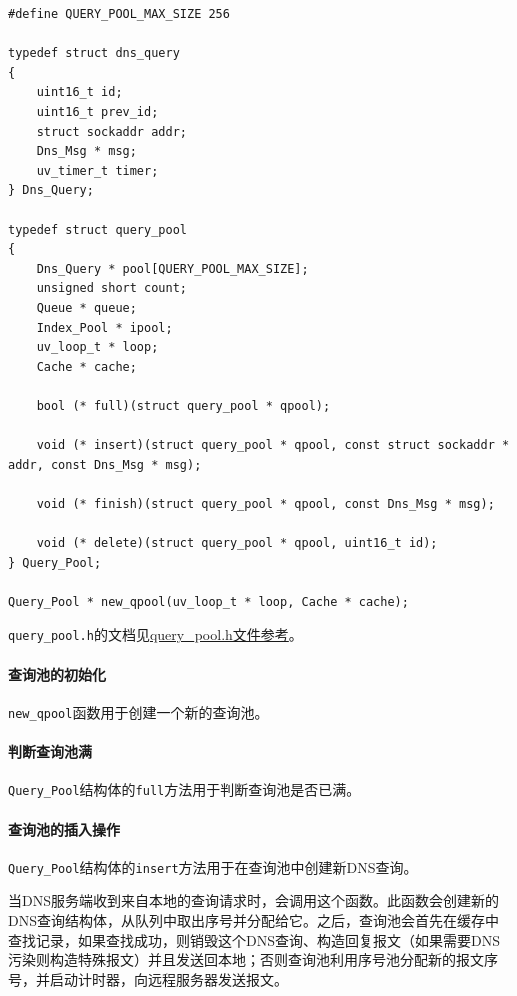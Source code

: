 \documentclass[lang=cn,11pt,a4paper,cite=authornum]{paper}
\begin{document}
\begin{code}
\begin{verbatim}
#define QUERY_POOL_MAX_SIZE 256

typedef struct dns_query
{
    uint16_t id; 
    uint16_t prev_id; 
    struct sockaddr addr; 
    Dns_Msg * msg; 
    uv_timer_t timer; 
} Dns_Query;
 
typedef struct query_pool
{
    Dns_Query * pool[QUERY_POOL_MAX_SIZE]; 
    unsigned short count; 
    Queue * queue; 
    Index_Pool * ipool; 
    uv_loop_t * loop; 
    Cache * cache; 
    
    bool (* full)(struct query_pool * qpool);
    
    void (* insert)(struct query_pool * qpool, const struct sockaddr * addr, const Dns_Msg * msg);
    
    void (* finish)(struct query_pool * qpool, const Dns_Msg * msg);
    
    void (* delete)(struct query_pool * qpool, uint16_t id);
} Query_Pool;
 
Query_Pool * new_qpool(uv_loop_t * loop, Cache * cache);
\end{verbatim}
\end{code}

\texttt{query_pool.h}的文档见\href{run:./APIdoc/query__pool_8h.html}{query\_pool.h文件参考}。

\paragraph{查询池的初始化}

\texttt{new_qpool}函数用于创建一个新的查询池。

\paragraph{判断查询池满}

\texttt{Query_Pool}结构体的\texttt{full}方法用于判断查询池是否已满。

\paragraph{查询池的插入操作}

\texttt{Query_Pool}结构体的\texttt{insert}方法用于在查询池中创建新DNS查询。

当DNS服务端收到来自本地的查询请求时，会调用这个函数。此函数会创建新的DNS查询结构体，从队列中取出序号并分配给它。之后，查询池会首先在缓存中查找记录，如果查找成功，则销毁这个DNS查询、构造回复报文（如果需要DNS污染则构造特殊报文）并且发送回本地；否则查询池利用序号池分配新的报文序号，并启动计时器，向远程服务器发送报文。
\end{document}
